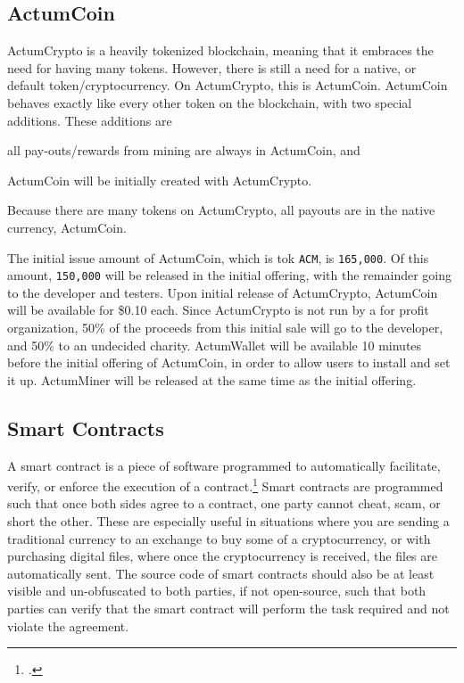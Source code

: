 \documentclass[letter]{article}
\begin{document}
\subsection{ActumCoin}
ActumCrypto is a heavily tokenized blockchain, meaning that it embraces the need for having many tokens. However, there is still a need for a native, or default token/cryptocurrency. On ActumCrypto, this is ActumCoin. ActumCoin behaves exactly like every other token on the blockchain, with two special additions. These additions are \begin{enumerate*}[label=(\alph*)]\item all pay-outs/rewards from mining are always in ActumCoin, and \item ActumCoin will be initially created with ActumCrypto.\end{enumerate*} Because there are many tokens on ActumCrypto, all payouts are in the native currency, ActumCoin.

The initial issue amount of ActumCoin, which is tok \texttt{ACM}, is \texttt{165,000}. Of this amount, \texttt{150,000} will be released in the initial offering, with the remainder going to the developer and testers. Upon initial release of ActumCrypto, ActumCoin will be available for \$0.10 each. Since ActumCrypto is not run by a for profit organization, 50\% of the proceeds from this initial sale will go to the developer, and 50\% to an undecided charity. ActumWallet will be available 10 minutes before the initial offering of ActumCoin, in order to allow users to install and set it up. ActumMiner will be released at the same time as the initial offering.

\subsection{Smart Contracts}
A smart contract is a piece of software programmed to automatically facilitate, verify, or enforce the execution of a contract.\footcite{smart_contract} Smart contracts are programmed such that once both sides agree to a contract, one party cannot cheat, scam, or short the other. These are especially useful in situations where you are sending a traditional currency to an exchange to buy some of a cryptocurrency, or with purchasing digital files, where once the cryptocurrency is received, the files are automatically sent. The source code of smart contracts should also be at least visible and un-obfuscated to both parties, if not open-source, such that both parties can verify that the smart contract will perform the task required and not violate the agreement.
\end{document}
